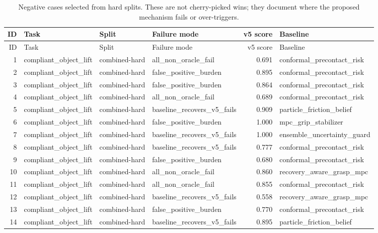 \documentclass{article}
\begin{document}
\begin{longtable}{@{}rlllrl@{}}
\caption{Negative cases selected from hard splits. These are not cherry-picked wins; they document where the proposed mechanism fails or over-triggers.}\\
\toprule
ID & Task & Split & Failure mode & v5 score & Baseline \\
\midrule
\endfirsthead
\toprule
ID & Task & Split & Failure mode & v5 score & Baseline \\
\midrule
\endhead
1 & compliant\_object\_lift & combined-hard & all\_non\_oracle\_fail & 0.691 & conformal\_precontact\_risk \\
2 & compliant\_object\_lift & combined-hard & false\_positive\_burden & 0.895 & conformal\_precontact\_risk \\
3 & compliant\_object\_lift & combined-hard & false\_positive\_burden & 0.864 & conformal\_precontact\_risk \\
4 & compliant\_object\_lift & combined-hard & all\_non\_oracle\_fail & 0.689 & conformal\_precontact\_risk \\
5 & compliant\_object\_lift & combined-hard & baseline\_recovers\_v5\_fails & 0.909 & particle\_friction\_belief \\
6 & compliant\_object\_lift & combined-hard & false\_positive\_burden & 1.000 & mpc\_grip\_stabilizer \\
7 & compliant\_object\_lift & combined-hard & baseline\_recovers\_v5\_fails & 1.000 & ensemble\_uncertainty\_guard \\
8 & compliant\_object\_lift & combined-hard & baseline\_recovers\_v5\_fails & 0.777 & conformal\_precontact\_risk \\
9 & compliant\_object\_lift & combined-hard & false\_positive\_burden & 0.680 & conformal\_precontact\_risk \\
10 & compliant\_object\_lift & combined-hard & all\_non\_oracle\_fail & 0.860 & recovery\_aware\_grasp\_mpc \\
11 & compliant\_object\_lift & combined-hard & all\_non\_oracle\_fail & 0.855 & conformal\_precontact\_risk \\
12 & compliant\_object\_lift & combined-hard & baseline\_recovers\_v5\_fails & 0.558 & recovery\_aware\_grasp\_mpc \\
13 & compliant\_object\_lift & combined-hard & false\_positive\_burden & 0.770 & conformal\_precontact\_risk \\
14 & compliant\_object\_lift & combined-hard & baseline\_recovers\_v5\_fails & 0.895 & particle\_friction\_belief \\

\end{longtable}
\end{document}

